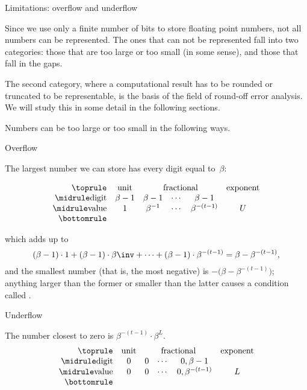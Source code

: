  {Limitations: overflow and underflow}
\label{sec:exceptions}

Since we use only a finite number of bits to store floating point
numbers, not all numbers can be represented. The ones that can not be
represented fall into two categories: those that are too large or too
small (in some sense), and those that fall in the gaps.

The second category, where a computational result has to be rounded or
truncated to be representable, is the basis of the field of round-off
error analysis. We will study this in some detail in the following
sections.

Numbers can be
too large or too small in the following ways.

 {Overflow}

The largest number we can store has every digit equal to~$\beta$:

\begin{equation}
\begin{array}{rccccc}
  \toprule
  &\textrm{unit}&\multicolumn{3}{c}{\textrm{fractional}}&\textrm{exponent}\\
  \midrule
  \textrm{digit}&\beta-1&\beta-1&\cdots&\beta-1&\\
  \midrule
  \textrm{value}&1&\beta^{-1}&\cdots&\beta^{-(t-1)}&U \\
  \bottomrule
\end{array}
\end{equation}

which adds up to
\begin{equation}
  (\beta-1)\cdot1+(\beta-1)\cdot\beta\inv+\cdots
+(\beta-1)\cdot\beta^{-(t-1)}=\beta-\beta^{-(t-1)},
\end{equation}
and the smallest number
(that is, the most negative)
is
$-\bigl(\beta-\beta^{-(t-1)}\bigr)$;
anything larger than the
former or smaller than the latter causes a condition called
.

 {Underflow}

The number closest to zero is $\beta^{-(t-1)}\cdot \beta^L$.
\begin{equation}
\begin{array}{rccccc}
  \toprule
  &\textrm{unit}&\multicolumn{3}{c}{\textrm{fractional}}&\textrm{exponent}\\
  \midrule
  \textrm{digit}&0&0&\cdots&0,\beta-1&\\
  \midrule
  \textrm{value}&0&0&\cdots&0,\beta^{-(t-1)}&L\\
  \bottomrule
\end{array}
\end{equation}

